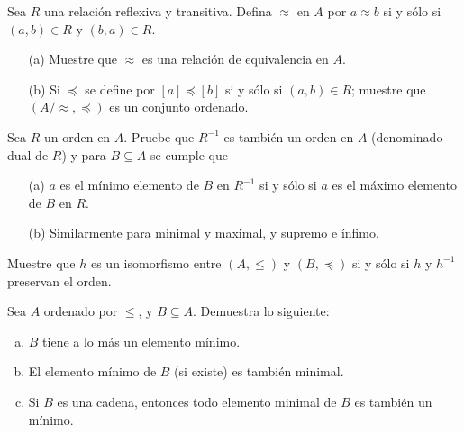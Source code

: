 \documentclass[fc]{tarea}
\begin{document}
\begin{exercise}
   Sea $R$ una relaci\'{o}n reflexiva y transitiva. Defina $\approx$ en $A$ por $a \approx b$ si y s\'{o}lo si $(a,b)\in R $ y $(b,a)\in R$.

\begin{enumerate}
    \item[(a)] Muestre que $\approx$ es una relaci\'{o}n de equivalencia en $A$.
    
    \item[(b)] Si $\preceq$ se define por $[a] \preceq [b]$ si y s\'{o}lo si $(a,b)\in R$; muestre que $(A/\approx, \preceq)$ es un conjunto ordenado.
\end{enumerate}
\end{exercise}

\begin{exercise}
   Sea $R$ un orden en $A$. Pruebe que $R^{-1}$ es tambi\'{e}n un orden en $A$ (denominado dual de $R$) y para $B \subseteq A$ se cumple que

\begin{enumerate}
    \item[(a)] $a$ es el m\'{i}nimo elemento de $B$ en $R^{-1}$ si y s\'{o}lo si $a$ es el m\'{a}ximo elemento de $B$ en $R$.
    
    \item[(b)] Similarmente para minimal y maximal, y supremo e \'{i}nfimo.
\end{enumerate}
\end{exercise}

\begin{exercise}
   Muestre que $h$ es un isomorfismo entre $(A, \leq)$ y $(B, \preceq)$ si y s\'{o}lo si $h$ y $h^{-1}$ preservan el orden.
\end{exercise}

\begin{exercise}
 Sea $A$ ordenado por $\leq$, y $B \subseteq A$. Demuestra lo siguiente:

\begin{enumerate}[(a)]
    \item $B$ tiene a lo m\'{a}s un elemento m\'{i}nimo.

    \item El elemento m\'{i}nimo de $B$ (si existe) es tambi\'{e}n minimal.

    \item Si $B$ es una cadena, entonces todo elemento minimal de $B$ es tambi\'{e}n un m\'{i}nimo.
\end{enumerate}
\end{exercise}
\end{document}

